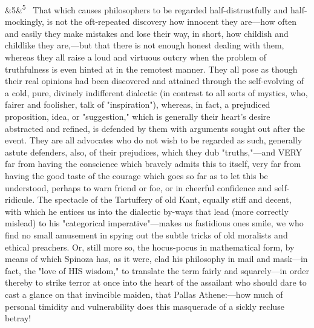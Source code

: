 \documentclass[12pt]{article}
\newcommand{\para}[1][]{\par\noindent\ifx&#1&\else\textsuperscript{\footnotesize #1}~\fi}
\begin{document}
\para[5] That which causes philosophers to be regarded half-distrustfully and half-mockingly, is not the oft-repeated discovery how innocent they are---how often and easily they make mistakes and lose their way, in short, how childish and childlike they are,---but that there is not enough honest dealing with them, whereas they all raise a loud and virtuous outcry when the problem of truthfulness is even hinted at in the remotest manner. They all pose as though their real opinions had been discovered and attained through the self-evolving of a cold, pure, divinely indifferent dialectic (in contrast to all sorts of mystics, who, fairer and foolisher, talk of "inspiration"), whereas, in fact, a prejudiced proposition, idea, or "suggestion," which is generally their heart's desire abstracted and refined, is defended by them with arguments sought out after the event. They are all advocates who do not wish to be regarded as such, generally astute defenders, also, of their prejudices, which they dub "truths,"---and VERY far from having the conscience which bravely admits this to itself, very far from having the good taste of the courage which goes so far as to let this be understood, perhaps to warn friend or foe, or in cheerful confidence and self-ridicule. The spectacle of the Tartuffery of old Kant, equally stiff and decent, with which he entices us into the dialectic by-ways that lead (more correctly mislead) to his "categorical imperative"---makes us fastidious ones smile, we who find no small amusement in spying out the subtle tricks of old moralists and ethical preachers. Or, still more so, the hocus-pocus in mathematical form, by means of which Spinoza has, as it were, clad his philosophy in mail and mask---in fact, the "love of HIS wisdom," to translate the term fairly and squarely---in order thereby to strike terror at once into the heart of the assailant who should dare to cast a glance on that invincible maiden, that Pallas Athene:---how much of personal timidity and vulnerability does this masquerade of a sickly recluse betray!
\end{document}
